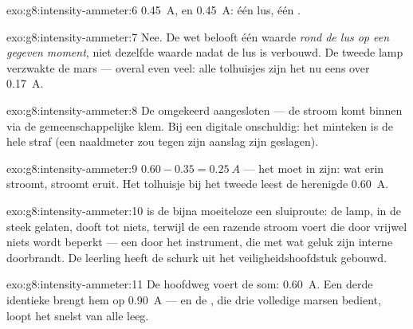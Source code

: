 \begin{solution}{exo:g8:intensity-ammeter:6}
\qty{0.45}{A}, en \qty{0.45}{A}: één lus, één
.
\end{solution}

\begin{solution}{exo:g8:intensity-ammeter:7}
Nee. De wet belooft één waarde \emph{rond de lus op een gegeven
moment}, niet dezelfde waarde nadat de lus is verbouwd. De tweede lamp
verzwakte de mars --- overal even veel: alle tolhuisjes zijn het nu
eens over \qty{0.17}{A}.
\end{solution}

\begin{solution}{exo:g8:intensity-ammeter:8}
De  omgekeerd aangesloten --- de stroom komt binnen via de
gemeenschappelijke klem. Bij een digitale  onschuldig: het
minteken is de hele straf (een naaldmeter zou tegen zijn aanslag zijn
geslagen).
\end{solution}

\begin{solution}{exo:g8:intensity-ammeter:9}
$0.60 - 0.35 = \qty{0.25}{A}$ --- het  moet in 
zijn: wat erin stroomt, stroomt eruit. Het tolhuisje bij het tweede
 leest de herenigde \qty{0.60}{A}.
\end{solution}

\begin{solution}{exo:g8:intensity-ammeter:10}
 is de bijna moeiteloze  een sluiproute: de lamp,
in de steek gelaten, dooft tot niets, terwijl de  een razende
stroom voert die door vrijwel niets wordt beperkt --- een
 door het instrument, die met wat geluk zijn interne
 doorbrandt. De leerling heeft de schurk uit het
veiligheidshoofdstuk gebouwd.
\end{solution}

\begin{solution}{exo:g8:intensity-ammeter:11}
De hoofdweg voert de som: \qty{0.60}{A}. Een derde identieke
 brengt hem op \qty{0.90}{A} --- en de
, die drie volledige marsen bedient, loopt het snelst
van alle leeg.
\end{solution}

